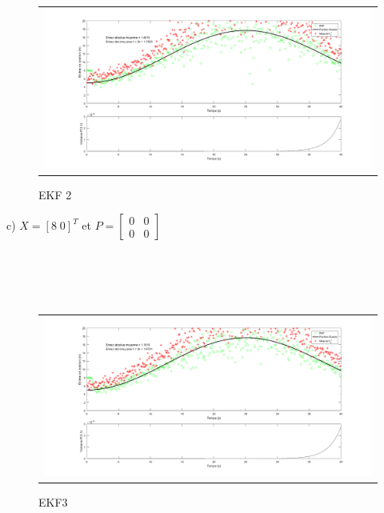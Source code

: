 \documentclass[11pt]{article}		%
\begin{document}
\vspace{-0.3in}
\label{EKF}
\begin{figure}[ht]
 \begin{center}
  \begin{tabular}{c}
    \includegraphics[width=1.0\textwidth]{ekf2.png} 
  \end{tabular}
 \end{center}
 \vspace{-0.3in}
 \caption{EKF 2}
 \label{EKF}
\end{figure}

\noindent c) $X = [8\; 0]^T$ et $P = \begin{bmatrix}0 & 0\\0 & 0\end{bmatrix}$ \\ \\ \\ \\ \\

\vspace{-0.3in}
\label{EKF}
\begin{figure}[ht]
 \begin{center}
  \begin{tabular}{c}
    \includegraphics[width=1.0\textwidth]{ekf3.png} 
  \end{tabular}
 \end{center}
 \vspace{-0.3in}
 \caption{EKF3}
 \label{EKF3}
\end{figure}
\end{document}

